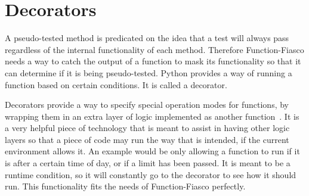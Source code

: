 %



\section{Decorators}
A pseudo-tested method is predicated on the idea that a test will always pass regardless of the internal functionality of each method. Therefore Function-Fiasco needs a way to catch the output of a function to mask its functionality so that it can determine if it is being pseudo-tested. Python provides a way of running a function based on certain conditions. It is called a decorator.

Decorators provide a way to specify special operation modes for functions, by wrapping them in an extra layer of logic implemented as another function~\cite{lutz2013learning}. It is a very helpful piece of technology that is meant to assist in having other logic layers so that a piece of code may run the way that is intended, if the current environment allows it. An example would be only allowing a function to run if it is after a certain time of day, or if a limit has been passed. It is meant to be a runtime condition, so it will constantly go to the decorator to see how it should run. This functionality fits the needs of Function-Fiasco perfectly.

